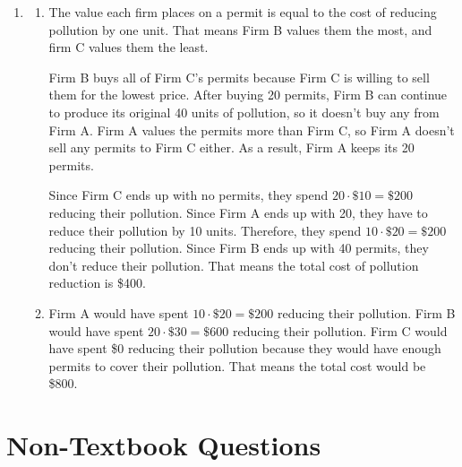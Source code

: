 \documentclass{article}
\begin{document}
\begin{enumerate}
\begin{enumerate}
	\end{enumerate}
	
\item 	

	\begin{enumerate}
	
	\item The value each firm places on a permit is equal to the cost of reducing pollution by one unit. That means Firm B values them the most, and firm C values them the least.
	
	Firm B buys all of Firm C's permits because Firm C is willing to sell them for the lowest price. After buying 20 permits, Firm B can continue to produce its original 40 units of pollution, so it doesn't buy any from Firm A. Firm A values the permits more than Firm C, so Firm A doesn't sell any permits to Firm C either. As a result, Firm A keeps its 20 permits. 

Since Firm C ends up with no permits, they spend $20 \cdot \$10 = \$200$ reducing their pollution. Since Firm A ends up with 20, they have to reduce their pollution by 10 units. Therefore, they spend $10 \cdot \$20 = \$200$ reducing their pollution. Since Firm B ends up with 40 permits, they don't reduce their pollution. That means the total cost of pollution reduction is \$400.

	\item Firm A would have spent $10 \cdot \$20 = \$200$ reducing their pollution. Firm B would have spent $20 \cdot \$30 = \$600$ reducing their pollution. Firm C would have spent \$0 reducing their pollution because they would have enough permits to cover their pollution. That means the total cost would be \$800.

	\end{enumerate}

\end{enumerate}

\section*{Non-Textbook Questions}
\end{document}
